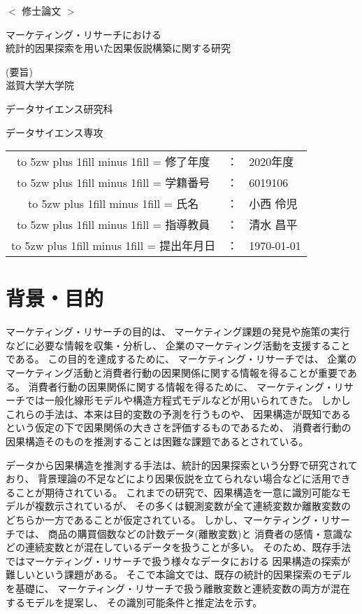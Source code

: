 \documentclass[uplatex]{jsarticle}
\theoremstyle{definition}
\newcommand{\kintou}[2]{%
\leavevmode
\hbox to #1{%
\kanjiskip=0pt plus 1fill minus 1fill
\xkanjiskip=\kanjiskip
#2}}
\begin{document}
\begin{center}
  \vspace*{15mm}
  \huge $<$ 修士論文 $>$ \par
  \vspace{15mm}
  \huge マーケティング・リサーチにおける \\
  統計的因果探索を用いた因果仮説構築に関する研究 \par
  \vspace{10.5mm}
  \LARGE (要旨) \\
  \vspace{10.5mm}
  \LARGE 滋賀大学大学院 \par
  \LARGE データサイエンス研究科 \par
  \LARGE データサイエンス専攻 \par
  \vspace{30mm}
  \LARGE
  \begin{tabular}{ccl}
    \kintou{5zw}{修了年度}&：& 2020年度 \\
    \kintou{5zw}{学籍番号}&：& 6019106 \\
    \kintou{5zw}{氏名}&：& 小西 伶児 \\
    \kintou{5zw}{指導教員}&：& 清水 昌平 \\
    \kintou{5zw}{提出年月日}&：& \today \\
  \end{tabular}
\end{center}

\thispagestyle{empty}
\newpage

\section{背景・目的}
マーケティング・リサーチの目的は、
マーケティング課題の発見や施策の実行などに必要な情報を収集・分析し、
企業のマーケティング活動を支援することである。
この目的を達成するために、
マーケティング・リサーチでは、
企業のマーケティング活動と消費者行動の因果関係に関する情報を得ることが重要である。
消費者行動の因果関係に関する情報を得るために、
マーケティング・リサーチでは一般化線形モデルや構造方程式モデルなどが用いられてきた。
しかしこれらの手法は、本来は目的変数の予測を行うものや、
因果構造が既知であるという仮定の下で因果関係の大きさを評価するものであるため、
消費者行動の因果構造そのものを推測することは困難な課題であるとされている。

データから因果構造を推測する手法は、統計的因果探索という分野で研究されており、
背景理論の不足などにより因果仮説を立てられない場合などに活用できることが期待されている。
これまでの研究で、因果構造を一意に識別可能なモデルが複数示されているが、
その多くは観測変数が全て連続変数か離散変数のどちらか一方であることが仮定されている。
しかし、マーケティング・リサーチでは、
商品の購買個数などの計数データ(離散変数)と
消費者の感情・意識などの連続変数とが混在しているデータを扱うことが多い。
そのため、既存手法ではマーケティング・リサーチで扱う様々なデータにおける
因果構造の探索が難しいという課題がある。
そこで本論文では、既存の統計的因果探索のモデルを基礎に、
マーケティング・リサーチで扱う離散変数と連続変数の両方が混在するモデルを提案し、
その識別可能条件と推定法を示す。
\end{document}
